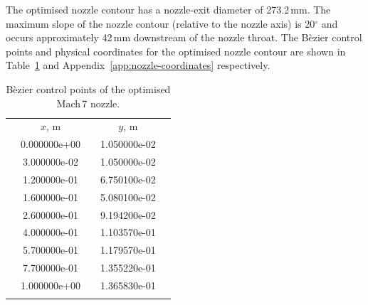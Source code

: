 \documentclass[12pt,a4paper]{article}
\begin{document}
The optimised nozzle contour has a nozzle-exit diameter of 273.2\,mm. The 
maximum slope of the nozzle contour (relative to the nozzle axis) is 
20$^\circ$ and occurs approximately 42\,mm downstream of the nozzle throat.
The B\`ezier control points and physical coordinates for the optimised 
nozzle contour are shown in Table~\ref{t:Bezier-control-points} and 
Appendix~\ref{app:nozzle-coordinates} respectively. 
%
\begin{table}[htbp]
 \begin{small}
  \begin{center}
  \caption{B\`ezier control points of the optimised Mach\,7 nozzle.}
  \label{t:Bezier-control-points}
  \vspace{2mm}
  \begin{tabular}{@{}c@{}@{}c@{}@{}c@{}@{}c@{}@{}c@{}@{}}
  \hline\hline\noalign{\smallskip}
  \hspace{12mm}   &  $x$, m  &   \hspace{10mm}  & $y$, m &  \hspace{12mm} \\
  \noalign{\smallskip}\hline\noalign{\smallskip}
  & 0.000000e+00 & & 1.050000e-02 & \\
  & 3.000000e-02 & & 1.050000e-02 & \\
  & 1.200000e-01 & & 6.750100e-02 & \\
  & 1.600000e-01 & & 5.080100e-02 & \\
  & 2.600000e-01 & & 9.194200e-02 & \\
  & 4.000000e-01 & & 1.103570e-01 & \\
  & 5.700000e-01 & & 1.179570e-01 & \\
  & 7.700000e-01 & & 1.355220e-01 & \\
  & 1.000000e+00 & & 1.365830e-01 & \\
  \noalign{\smallskip}\hline\hline
  \end{tabular}
  \end{center}
 \end{small}
\end{table}
%
\end{document}
